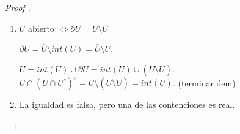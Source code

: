 \begin{enumerate}
\begin{proof}[Proof ]
\begin{enumerate}
			\item $U$ abierto $\iff \partial U = \overline{U} \setminus U$

			\Onlyifstep $\partial U = \overline{U} \setminus int(U) = \overline{U} \setminus U$.

			\Ifstep $\overline{U} =  int(U) \cup \partial U = int(U) \cup (\overline{U} \setminus U)$. $\overline{U} \cap (\overline{U} \cap U^c)^c = \overline{U} \setminus (\overline{U}\setminus U) = int(U)$. (terminar dem)

			\item La igualdad es falsa, pero una de las contenciones es real.
		\end{enumerate}
	\end{proof}
\end{enumerate}
